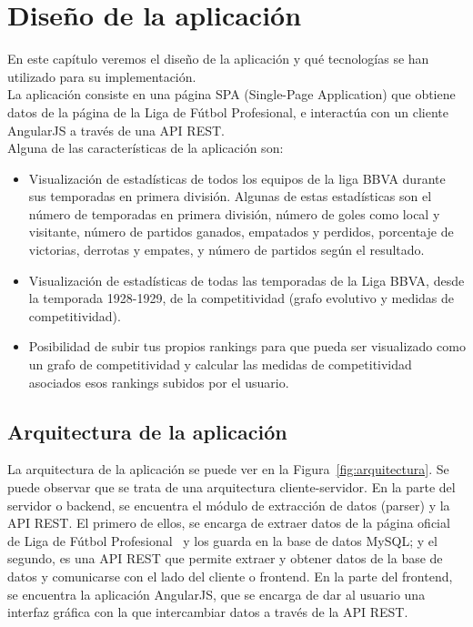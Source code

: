 \chapter{Diseño de la aplicación}

En este capítulo veremos el diseño de la aplicación y qué tecnologías se han utilizado para su implementación.\\

La aplicación consiste en una página SPA (Single-Page Application) que obtiene datos de la página de la Liga de Fútbol Profesional, e interactúa con un cliente AngularJS a través de una API REST.\\

Alguna de las características de la aplicación son:

\begin{itemize}
\item Visualización de estadísticas de todos los equipos de la liga BBVA durante sus temporadas en primera división. Algunas de estas estadísticas son el número de temporadas en primera división, número de goles como local y visitante, número de partidos ganados, empatados y perdidos, porcentaje de victorias, derrotas y empates, y número de partidos según el resultado.

\item Visualización de estadísticas de todas las temporadas de la Liga BBVA, desde la temporada 1928-1929, de la competitividad (grafo evolutivo y medidas de competitividad).

\item Posibilidad de subir tus propios rankings para que pueda ser visualizado como un grafo de competitividad y calcular las medidas de competitividad asociados esos rankings subidos por el usuario.
\end{itemize}

\section{Arquitectura de la aplicación}

La arquitectura de la aplicación se puede ver en la Figura~\ref{fig:arquitectura}. Se puede observar que se trata de una arquitectura cliente-servidor. En la parte del servidor o backend, se encuentra el módulo de extracción de datos (parser) y la API REST. El primero de ellos, se encarga de extraer datos de la página oficial de Liga de Fútbol Profesional~\cite{lfp} y los guarda en la base de datos MySQL; y el segundo, es una API REST que permite extraer y obtener datos de la base de datos y comunicarse con el lado del cliente o frontend. En la parte del frontend, se encuentra la aplicación AngularJS, que se encarga de dar al usuario una interfaz gráfica con la que intercambiar datos a través de la API REST.

